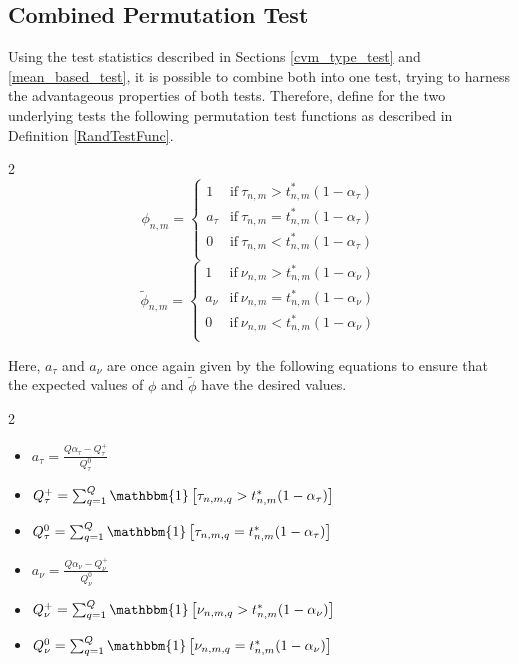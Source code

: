 \documentclass[12pt, a4paper]{article}
\theoremstyle{MAstyle} \newtheorem{assumption}{Assumption}[section]
\theoremstyle{MAstyle} \newtheorem{definition}{Definition}[section]
\theoremstyle{MAstyle} \newtheorem{theorem}{Theorem}[section]
\begin{document}
		\newpage
		\subsection{Combined Permutation Test}
			Using the test statistics described in Sections \ref{cvm_type_test} and \ref{mean_based_test}, it is possible to combine both into one test, trying to harness the advantageous properties of both tests. Therefore, define for the two underlying tests the following permutation test functions as described in Definition \ref{RandTestFunc}.
			\begin{multicols}{2}
				\noindent
				\begin{equation*}
					\phi_{n,m} = \begin{cases}
						1 &\text{if} \ \tau_{n,m} > t^{*}_{n,m}(1-\alpha_{\tau}) \\
						a_{\tau} &\text{if} \ \tau_{n,m} = t^{*}_{n,m}(1-\alpha_{\tau}) \\
						0 &\text{if} \ \tau_{n,m} < t^{*}_{n,m}(1-\alpha_{\tau}) \\
					\end{cases}
				\end{equation*}
				\begin{equation}
					\tilde{\phi}_{n,m} = \begin{cases}
						1 &\text{if} \ \nu_{n,m} > t^{*}_{n,m}(1-\alpha_{\nu}) \\
						a_{\nu} &\text{if} \ \nu_{n,m} = t^{*}_{n,m}(1-\alpha_{\nu}) \\
						0 &\text{if} \ \nu_{n,m} < t^{*}_{n,m}(1-\alpha_{\nu}) \\
					\end{cases}
				\end{equation}
			\end{multicols}
			Here, $a_\tau$ and $a_\nu$ are once again given by the following equations to ensure that the expected values of $\phi$ and $\tilde{\phi}$ have the desired values.
			\begin{multicols}{2}
				\begin{itemize}
					\item $a_{\tau} = \frac{Q\alpha_{\tau} - Q_{\tau}^{+}}{Q_{\tau}^{0}}$ 
					\item $Q_{\tau}^{+} = \sum_{q = 1}^{Q}\mathbbm{1}\left[\tau_{n,m,q} > t^{*}_{n,m}(1-\alpha_{\tau})\right]$
					\item $Q_{\tau}^{0} = \sum_{q = 1}^{Q}\mathbbm{1}\left[\tau_{n,m,q} = t^{*}_{n,m}(1-\alpha_{\tau})\right]$
					\item $a_{\nu} = \frac{Q\alpha_{\nu} - Q_{\nu}^{+}}{Q_{\nu}^{0}}$ 
					\item $Q_{\nu}^{+} = \sum_{q = 1}^{Q}\mathbbm{1}\left[\nu_{n,m,q} > t^{*}_{n,m}(1-\alpha_{\nu})\right]$
					\item $Q_{\nu}^{0} = \sum_{q = 1}^{Q}\mathbbm{1}\left[\nu_{n,m,q} = t^{*}_{n,m}(1-\alpha_{\nu})\right]$
				\end{itemize} 
			\end{multicols}
\end{document}
